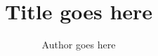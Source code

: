 \documentclass{acm_proc_article-sp}
\title{Title goes here}
\author{Author goes here}
\begin{document}
    \maketitle

    \nocite{*}
    \printbibliography{}
\end{document}
